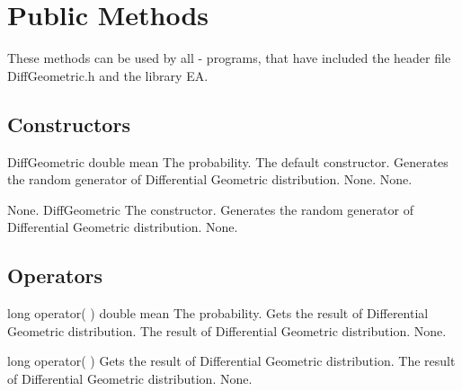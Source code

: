 \clearpage

\section{Public Methods}

\noindent
These methods can be used by all \cpp - programs, that have included the
header file DiffGeometric.h and the library EA.

\subsection{Constructors}

\setNormalInstance
\printMethodWithOneParam
{}
{DiffGeometric}
{double}
{mean}
{The probability.}
{The default constructor. Generates the random generator of
Differential Geometric distribution.}
{None.}
{None.}

\setNormalInstance
\setCorrectWidthThree{8pt}
\printMethodWithParamsSaved
{}
{None.}
{DiffGeometric}
{The constructor. Generates the random generator of Differential
Geometric distribution.}
{None.}
\setCorrectWidthThree{4pt}

\vspace*{10mm}

\subsection{Operators}

\setNormalInstance
\printMethodWithOneParam
{long}
{operator( )}
{double}
{mean}
{The probability.}
{Gets the result of Differential Geometric distribution.}
{The result of Differential Geometric distribution.}
{None.}

\clearpage

\setNormalInstance
\printEmptyMethodReturnSpecial
{long}
{operator( )}
{Gets the result of Differential Geometric distribution.}
{The result of Differential Geometric distribution.}
{None.}

